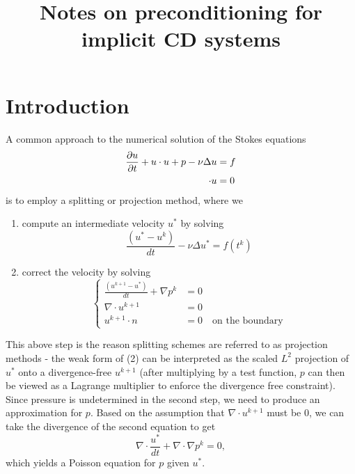 \documentclass[final,leqno]{siamltex}
\title{Notes on preconditioning for implicit CD systems}
\let\grad\relax
\newcommand{\grad}{\nabla}
\renewcommand{\div}{\grad \cdot}
\newcommand{\pd}[2]{\frac{\partial#1}{\partial#2}}
\begin{document}
\maketitle

\section{Introduction}

A common approach to the numerical solution of the Stokes equations
\begin{align*}
\pd{u}{t} + u\cdot\grad u + \grad p - \nu \Delta u &= f \\
\div u &= 0
\end{align*}
is to employ a splitting or projection method, where we 
\begin{enumerate}
\item compute an intermediate velocity $u^*$ by solving $$\frac{(u^*-u^k)}{dt} - \nu\Delta u^* = f(t^k)$$
\item correct the velocity by solving 
$$\begin{cases}
\frac{(u^{k+1}-u^*)}{dt} + \nabla p^k &= 0\\
\nabla \cdot u^{k+1} &= 0\\
u^{k+1}\cdot n &= 0 \quad \text{on the boundary}
\end{cases}$$
\end{enumerate}
This above step is the reason splitting schemes are referred to as projection methods - the weak form of (2) can be interpreted as the scaled $L^2$ projection of $u^*$ onto a divergence-free $u^{k+1}$ (after multiplying by a test function, $p$ can then be viewed as a Lagrange multiplier to enforce the divergence free constraint).  Since pressure is undetermined in the second step, we need to produce an approximation for $p$.  Based on the assumption that $\nabla \cdot u^{k+1}$ must be $0$, we can take the divergence of the second equation to get $$\nabla \cdot \frac{u^*}{dt} + \nabla\cdot \nabla p^k = 0,$$ which yields a Poisson equation for $p$ given $u^*$. 
\end{document}
